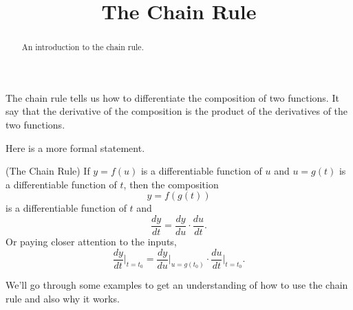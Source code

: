 \documentclass{ximera}
\title{The Chain Rule}
\begin{document}
\begin{abstract}
An introduction to the chain rule.
\end{abstract}
\maketitle


The chain rule tells us how to differentiate the composition of two functions. It say that the derivative of the composition is the product of the derivatives of the two functions.

Here is a more formal statement.

\begin{theorem}
(The Chain Rule) If $y=f(u)$ is a differentiable function of $u$ and $u=g(t)$ is a differentiable function of $t$, then the composition
\[
      y = f(g(t))
\]
is a differentiable function of $t$ and
\[
   \frac{dy}{dt} = \frac{dy}{du} \cdot \frac{du}{dt} .
\]
Or paying closer attention to the inputs,
\[
      \frac{dy}{dt}\Big|_{t=t_0} = \frac{dy}{du}\Big|_{u=g(t_0)} \cdot \frac{du}{dt}\Big|_{t=t_0} . 
\]

\end{theorem}


We'll go through some examples to get an understanding of how to use the chain rule and also why it works.
\end{document}
